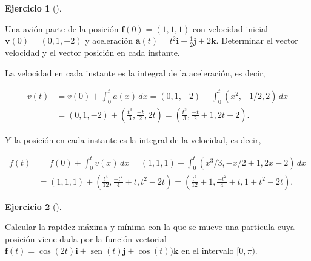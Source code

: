 \documentclass[
  a4paper,
]{scrreport}
\theoremstyle{definition}
\newtheorem{exercise}{Ejercicio}[chapter]
\theoremstyle{remark}
\begin{document}
\begin{exercise}[]\protect\hypertarget{exr-cinematica-avion}{}\label{exr-cinematica-avion}

Una avión parte de la posición \(\mathbf{f}(0)=(1, 1, 1)\) con velocidad
inicial \(\mathbf{v}(0)=(0,1,-2)\) y aceleración
\(\mathbf{a}(t)=t^2\mathbf{i}-\frac{1}{2}\mathbf{j}+2\mathbf{k}\).
Determinar el vector velocidad y el vector posición en cada instante.

\end{exercise}

\begin{tcolorbox}[enhanced jigsaw, left=2mm, coltitle=black, colbacktitle=quarto-callout-tip-color!10!white, opacitybacktitle=0.6, colback=white, breakable, titlerule=0mm, toptitle=1mm, rightrule=.15mm, bottomtitle=1mm, bottomrule=.15mm, toprule=.15mm, leftrule=.75mm, arc=.35mm, opacityback=0, title=\textcolor{quarto-callout-tip-color}{\faLightbulb}\hspace{0.5em}{Solución}, colframe=quarto-callout-tip-color-frame]

La velocidad en cada instante es la integral de la aceleración, es
decir,

\begin{align*}
v(t) 
&= v(0) + \int_0^t a(x)\,dx 
= (0,1,-2) + \int_0^t (x^2,-1/2,2)\,dx \\
&= (0,1,-2) + (\frac{t^3}{3},\frac{-t}{2},2t) 
= \left(\frac{t^3}{3},\frac{-t}{2}+1,2t-2\right).
\end{align*}

Y la posición en cada instante es la integral de la velocidad, es decir,

\begin{align*}
f(t) 
&= f(0) + \int_0^t v(x)\,dx 
= (1,1,1) + \int_0^t (x^3/3,-x/2+1,2x-2)\,dx \\
&= (1,1,1) + (\frac{t^4}{12},\frac{-t^2}{4}+t, t^2-2t)
= \left(\frac{t^4}{12}+1,\frac{-t^2}{4}+t,1+t^2-2t\right).
\end{align*}

\end{tcolorbox}

\begin{exercise}[]\protect\hypertarget{exr-cinematica}{}\label{exr-cinematica}

Calcular la rapidez máxima y mínima con la que se mueve una partícula
cuya posición viene dada por la función vectorial
\(\mathbf{f}(t) = \cos(2t)\mathbf{i} + \operatorname{sen}(t)\mathbf{j} + \cos(t))\mathbf{k}\)
en el intervalo \([0,\pi)\).

\end{exercise}
\end{document}
